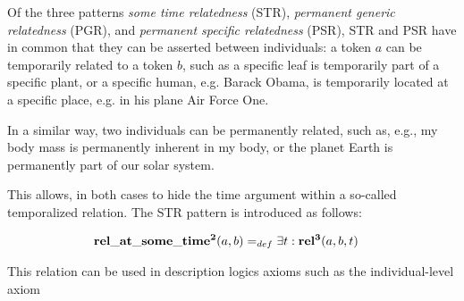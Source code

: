 
Of the three patterns \emph{some time relatedness} (STR), \emph{permanent generic relatedness} (PGR), and \emph{permanent specific relatedness} (PSR), STR and PSR have in common that they can be asserted between individuals: a token $a$ can be temporarily related to a token $b$, such as a specific leaf is temporarily part of a specific plant, or a specific human, e.g. Barack Obama, is temporarily located at a specific place, e.g. in his plane Air Force One.

In a similar way, two individuals can be permanently related, such as, e.g., my body mass is permanently inherent in my body, or the planet Earth is permanently part of our solar system.

This allows, in both cases to hide the time argument within a so-called temporalized relation.
The STR pattern is introduced as follows:  

\begin{equation}
\begin{split}
\mathrm{\mathbf{rel\_at\_some\_time^2}} (a,b) =_{def}&\; \exists t: \mathrm{\mathbf{rel^3}}(a,b,t)  
\end{split}
\label{eq:temporarily:ind}
\end{equation}

This relation can be used in description logics axioms such as the individual-level axiom

